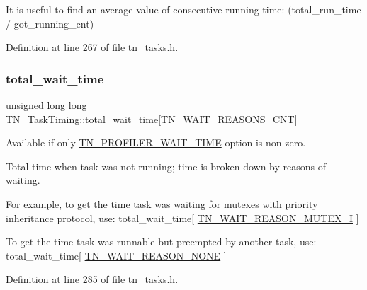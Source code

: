 It is useful to find an average value of consecutive running time\+: {\ttfamily (total\+\_\+run\+\_\+time / got\+\_\+running\+\_\+cnt)} 

Definition at line 267 of file tn\+\_\+tasks.\+h.

\mbox{\label{structTN__TaskTiming_a0832c998c39b3e8400ccbb386bfbc7d9}} 
\subsubsection{\texorpdfstring{total\+\_\+wait\+\_\+time}{total\_wait\_time}}
{\footnotesize\ttfamily unsigned long long T\+N\+\_\+\+Task\+Timing\+::total\+\_\+wait\+\_\+time\mbox{[}\hyperlink{tn__tasks_8h_a343b0332013c15d6e878c2f60ed2c9b7a54de9b2b340a9d3f444aaeccda0764ea}{T\+N\+\_\+\+W\+A\+I\+T\+\_\+\+R\+E\+A\+S\+O\+N\+S\+\_\+\+C\+NT}\mbox{]}}



Available if only {\ttfamily \hyperlink{tn__cfg__default_8h_a1c04db5457adb54f7cc38d42b29a5ad7}{T\+N\+\_\+\+P\+R\+O\+F\+I\+L\+E\+R\+\_\+\+W\+A\+I\+T\+\_\+\+T\+I\+ME}} option is non-\/zero. 

Total time when task was not running; time is broken down by reasons of waiting.

For example, to get the time task was waiting for mutexes with priority inheritance protocol, use\+: {\ttfamily total\+\_\+wait\+\_\+time\mbox{[} \hyperlink{tn__tasks_8h_a343b0332013c15d6e878c2f60ed2c9b7a7e9f9bbeea45338617a5d988fc2f4875}{T\+N\+\_\+\+W\+A\+I\+T\+\_\+\+R\+E\+A\+S\+O\+N\+\_\+\+M\+U\+T\+E\+X\+\_\+I} \mbox{]}}

To get the time task was runnable but preempted by another task, use\+: {\ttfamily total\+\_\+wait\+\_\+time\mbox{[} \hyperlink{tn__tasks_8h_a343b0332013c15d6e878c2f60ed2c9b7a91327db45e01ddc873b4030e5638a4a4}{T\+N\+\_\+\+W\+A\+I\+T\+\_\+\+R\+E\+A\+S\+O\+N\+\_\+\+N\+O\+NE} \mbox{]}} 

Definition at line 285 of file tn\+\_\+tasks.\+h.

\mbox{\label{structTN__TaskTiming_abb5335583d7c59aaca03753ee121c1bb}} 
